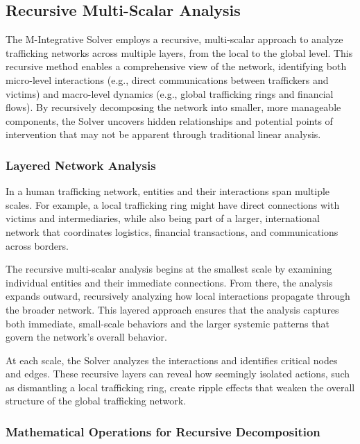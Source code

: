 \documentclass[%
 preprint, linenumbers,
 amsmath,amssymb,
 aps, physrev,
]{revtex4-2}
\begin{document}
\subsection{Recursive Multi-Scalar Analysis}

The M-Integrative Solver employs a recursive, multi-scalar approach to analyze trafficking networks across multiple layers, from the local to the global level. This recursive method enables a comprehensive view of the network, identifying both micro-level interactions (e.g., direct communications between traffickers and victims) and macro-level dynamics (e.g., global trafficking rings and financial flows). By recursively decomposing the network into smaller, more manageable components, the Solver uncovers hidden relationships and potential points of intervention that may not be apparent through traditional linear analysis.

\subsubsection{Layered Network Analysis}

In a human trafficking network, entities and their interactions span multiple scales. For example, a local trafficking ring might have direct connections with victims and intermediaries, while also being part of a larger, international network that coordinates logistics, financial transactions, and communications across borders.

The recursive multi-scalar analysis begins at the smallest scale by examining individual entities and their immediate connections. From there, the analysis expands outward, recursively analyzing how local interactions propagate through the broader network. This layered approach ensures that the analysis captures both immediate, small-scale behaviors and the larger systemic patterns that govern the network’s overall behavior.

At each scale, the Solver analyzes the interactions and identifies critical nodes and edges. These recursive layers can reveal how seemingly isolated actions, such as dismantling a local trafficking ring, create ripple effects that weaken the overall structure of the global trafficking network.

\subsubsection{Mathematical Operations for Recursive Decomposition}
\end{document}
